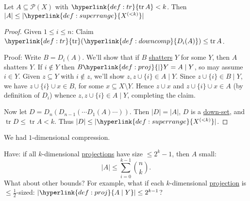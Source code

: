\documentclass{article}
\DeclareMathOperator\tr{tr}
\newcommand{\named}[1]{\textbf{#1}\index{#1}}
\let\subset\subseteq
\begin{document}
\begin{nthm}\label{thm:3.1}
  Let $A \subset \mathcal{P}(X)$ with $\hyperlink{def:tr}{\tr A} < k$. Then $|A| \leq |\hyperlink{def:superrange}{X^{(<k)}}|$
\end{nthm}
\begin{proof}
  Given $1 \leq i \leq n$:
  Claim $\hyperlink{def:tr}{\tr}(\hyperlink{def:downcomp}{D_i(A)}) \leq \tr A$.

  Proof: Write $B = D_i(A)$.
  We'll show that if $B$ \hyperlink{def:tr}{shatters} $Y$ for some $Y$, then $A$ shatters $Y$.
  If $i \notin Y$ then $B \hyperlink{def:proj}{\mid} Y = A \mid Y$, so may assume $i \in Y$.
  Given $z \subset Y$ with $i \notin z$, we'll show $z, z \cup \{i\} \in A \mid Y$.
  Since $z \cup \{i\} \in B \mid Y$, we have $z \cup \{i\} \cup x \in B$, for some $x \subset X \setminus Y$.
  Hence $z \cup x$ and $z \cup \{i\} \cup x \in A$ (by definition of $D_i$)
  whence $z,z \cup \{i\} \in A \mid Y$, completing the claim.

  Now let $D = D_n(D_{n-1}(\dotsb D_1(A) \dotsb))$.
  Then $|D| = |A|$, $D$ is a \hyperlink{def:downset}{down-set}, and $\tr D \leq \tr A < k$.
  Thus $|D| \leq |\hyperlink{def:superrange}{X^{(<k)}}|$.
\end{proof}
\begin{remark}
  We had $1$-dimensional compression.
\end{remark}
Have: if all $k$-dimensional \hyperlink{def:proj}{projections} have size $\leq 2^k - 1$, then $A$ small:
\begin{equation*}|A| \leq \sum_{i=0}^{k-1} \binom{n}{k}.\end{equation*}
What about other bounds?
For example, what if each $k$-dimensional \hyperlink{def:proj}{projection} is $\leq \frac{1}{2}$-sized: $|\hyperlink{def:proj}{A \mid Y}| \leq 2^{k-1}$?
\end{document}
